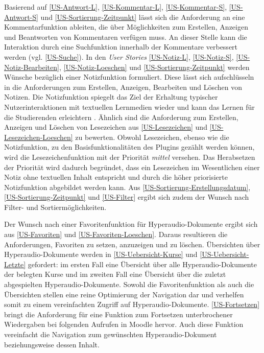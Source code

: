 Basierend auf \ref{US-Antwort-L}, \ref{US-Kommentar-L}, \ref{US-Kommentar-S}, \ref{US-Antwort-S} und \ref{US-Sortierung-Zeitpunkt} lässt sich die Anforderung an eine Kommentarfunktion ableiten, die über Möglichkeiten zum Erstellen, Anzeigen und Beantworten von Kommentaren verfügen muss. An dieser Stelle kann die Interaktion durch eine Suchfunktion innerhalb der Kommentare verbessert werden (vgl. \ref{US-Suche}). In den \textit{User Stories} \ref{US-Notiz-L}, \ref{US-Notiz-S}, \ref{US-Notiz-Bearbeiten}, \ref{US-Notiz-Loeschen} und \ref{US-Sortierung-Zeitpunkt} werden Wünsche bezüglich einer Notizfunktion formuliert. Diese lässt sich aufschlüsseln in die Anforderungen zum Erstellen, Anzeigen, Bearbeiten und Löschen von Notizen. Die Notizfunktion spiegelt das Ziel der Erhaltung typischer Nutzerinteraktionen mit textuellen Lernmedien wieder und kann das Lernen für die Studierenden erleichtern \citep{scutter2010students}. Ähnlich sind die Anforderung zum Erstellen, Anzeigen und Löschen von Lesezeichen aus \ref{US-Lesezeichen} und \ref{US-Lesezeichen-Loeschen} zu bewerten. Obwohl Lesezeichen, ebenso wie die Notizfunktion, zu den Basisfunktionalitäten des Plugins gezählt werden können, wird die Lesezeichenfunktion mit der Priorität \textit{mittel} versehen. Das Herabsetzen der Priorität wird dadurch begründet, dass ein Lesezeichen im Wesentlichen einer Notiz ohne textuellen Inhalt entspricht und durch die höher priorisierte Notizfunktion abgebildet werden kann. Aus \ref{US-Sortierung-Erstellungsdatum}, \ref{US-Sortierung-Zeitpunkt} und \ref{US-Filter} ergibt sich zudem der Wunsch nach Filter- und Sortiermöglichkeiten. 

Der Wunsch nach einer Favoritenfunktion für Hyperaudio-Dokumente ergibt sich aus \ref{US-Favoriten} und \ref{US-Favoriten-Loeschen}. Daraus resultieren die Anforderungen, Favoriten zu setzen, anzuzeigen und zu löschen. Übersichten über Hyperaudio-Dokumente werden in \ref{US-Uebersicht-Kurse} und \ref{US-Uebersicht-Letzte} gefordert: im ersten Fall eine Übersicht über alle Hyperaudio-Dokumente der belegten Kurse und im zweiten Fall eine Übersicht über die zuletzt abgespielten Hyperaudio-Dokumente. Sowohl die Favoritenfunktion als auch die Übersichten stellen eine reine Optimierung der Navigation dar und verhelfen somit zu einem vereinfachten Zugriff auf Hyperaudio-Dokumente. \ref{US-Fortsetzen} bringt die Anforderung für eine Funktion zum Fortsetzen unterbrochener Wiedergaben bei folgenden Aufrufen in Moodle hervor. Auch diese Funktion vereinfacht die Navigation zum gewünschten Hyperaudio-Dokument beziehungsweise dessen Inhalt.

